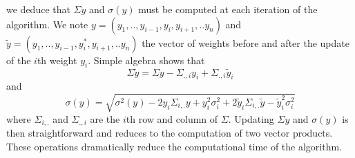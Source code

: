 we deduce that $\Sigma y$ and $\sigma (y) $ must be computed at each iteration of the algorithm. We note $y = (y_1,.., y_{i-1}, y_i, y_{i+1},..y_n)$ and $\tilde{y} =(y_1,.., y_{i-1}, y_i^*, y_{i+1},..y_n)$ the vector of weights before and after the update of the $i$th weight $y_i$. Simple algebra shows that
\begin{equation}
\Sigma \tilde{y} = \Sigma y - \Sigma_{.,i} y_i + \Sigma_{.,i}\tilde{y}_i
\end{equation}
and
\begin{equation}
\sigma(y) = \sqrt{\sigma^2(y) - 2y_i\Sigma_{i,.}y + y_i^2\sigma_i^2 + 2\tilde{y}_i\Sigma_{i,.}\tilde{y} -  \tilde{y}_i^2\sigma_i^2}
\end{equation}
where $\Sigma_{i,.}$ and $\Sigma_{.,i}$ are the $i$th row and column of $\Sigma$. Updating $\Sigma y$ and $\sigma(y)$ is then
straightforward and reduces to the computation of two vector products. These operations dramatically reduce the computational time of the algorithm.

